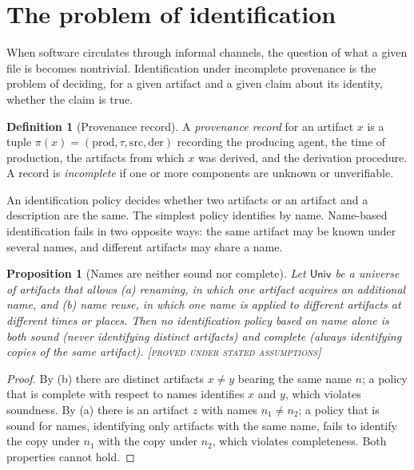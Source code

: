 \documentclass[11pt,twoside,openright]{book}
\theoremstyle{plain}
\newtheorem{proposition}[theorem]{Proposition}
\theoremstyle{definition}
\newtheorem{definition}[theorem]{Definition}
\theoremstyle{remark}
\newcommand{\Proved}{\textup{\textsc{[proved under stated assumptions]}}}
\begin{document}
\section{The problem of identification}

When software circulates through informal channels, the question of what a given file is becomes nontrivial. Identification under incomplete provenance is the problem of deciding, for a given artifact and a given claim about its identity, whether the claim is true.

\begin{definition}[Provenance record]\label{def:provrecord}
A \emph{provenance record} for an artifact $x$ is a tuple $\pi(x)=(\mathrm{prod},\tau,\mathrm{src},\mathrm{der})$ recording the producing agent, the time of production, the artifacts from which $x$ was derived, and the derivation procedure. A record is \emph{incomplete} if one or more components are unknown or unverifiable.
\end{definition}

An identification policy decides whether two artifacts or an artifact and a description are the same. The simplest policy identifies by name. Name-based identification fails in two opposite ways: the same artifact may be known under several names, and different artifacts may share a name.

\begin{proposition}[Names are neither sound nor complete]\label{prop:namesidentify}
Let $\mathsf{Univ}$ be a universe of artifacts that allows (a) renaming, in which one artifact acquires an additional name, and (b) name reuse, in which one name is applied to different artifacts at different times or places. Then no identification policy based on name alone is both sound (never identifying distinct artifacts) and complete (always identifying copies of the same artifact).
\Proved{}
\end{proposition}

\begin{proof}
By (b) there are distinct artifacts $x\neq y$ bearing the same name $n$; a policy that is complete with respect to names identifies $x$ and $y$, which violates soundness. By (a) there is an artifact $z$ with names $n_1\neq n_2$; a policy that is sound for names, identifying only artifacts with the same name, fails to identify the copy under $n_1$ with the copy under $n_2$, which violates completeness. Both properties cannot hold.
\end{proof}
\end{document}
